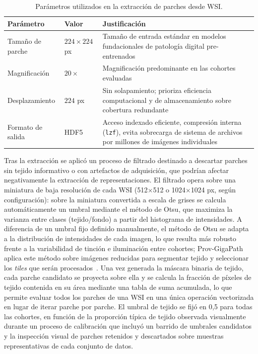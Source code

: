 \begin{table}[htbp]
    \centering
    \caption{Parámetros utilizados en la extracción de parches desde WSI.}
    \label{tab:patch_params}
    \begin{tabular}{p{4cm} p{3cm} p{7cm}}
        \toprule
        \textbf{Parámetro} & \textbf{Valor} & \textbf{Justificación} \\
        \midrule
        Tamaño de parche & $224 \times 224$ px & Tamaño de entrada estándar en modelos fundacionales de patología digital pre-entrenados  \\
        Magnificación & $20\times$ & Magnificación predominante en las cohortes evaluadas \\
        Desplazamiento & $224$ px & Sin solapamiento; prioriza eficiencia computacional y de almacenamiento sobre cobertura redundante \\
        Formato de salida & HDF5 & Acceso indexado eficiente, compresión interna (\texttt{lzf}), evita sobrecarga de sistema de archivos por millones de imágenes individuales \\
        \bottomrule
    \end{tabular}
\end{table}

Tras la extracción se aplicó un proceso de filtrado destinado a descartar parches sin tejido informativo o con artefactos de adquisición, que podrían afectar negativamente la extracción de representaciones. El filtrado opera sobre una miniatura de baja resolución de cada WSI (512$\times$512 o 1024$\times$1024 px, según configuración): sobre la miniatura convertida a escala de grises se calcula automáticamente un umbral mediante el método de Otsu, que maximiza la varianza entre clases (tejido/fondo) a partir del histograma de intensidades. A diferencia de un umbral fijo definido manualmente, el método de Otsu se adapta a la distribución de intensidades de cada imagen, lo que resulta más robusto frente a la variabilidad de tinción e iluminación entre cohortes; Prov-GigaPath aplica este método sobre imágenes reducidas para segmentar tejido y seleccionar los \textit{tiles} que serán procesados~\parencite{xu2024provgigapath}. Una vez generada la máscara binaria de tejido, cada parche candidato se proyecta sobre ella y se calcula la fracción de píxeles de tejido contenida en su área mediante una tabla de suma acumulada, lo que permite evaluar todos los parches de una WSI en una única operación vectorizada en lugar de iterar parche por parche. El umbral de tejido se fijó en 0,5 para todas las cohortes, en función de la proporción típica de tejido observada visualmente durante un proceso de calibración que incluyó un barrido de umbrales candidatos y la inspección visual de parches retenidos y descartados sobre muestras representativas de cada conjunto de datos.

